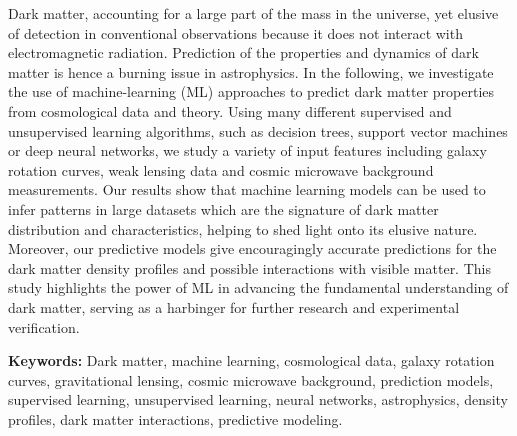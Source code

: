 
Dark matter, accounting for a large part of the mass in the universe, yet elusive of detection in conventional observations because it does not interact with electromagnetic radiation.\cite{planck2016} Prediction of the properties and dynamics of dark matter is hence a burning issue in astrophysics. In the following, we investigate the use of machine-learning (ML) approaches to predict dark matter properties from cosmological data and theory. Using many different supervised and unsupervised learning algorithms, such as decision trees, support vector machines or deep neural networks, we study a variety of input features including galaxy rotation curves, weak lensing data and cosmic microwave background measurements. Our results show that machine learning models can be used to infer patterns in large datasets which are the signature of dark matter distribution and characteristics, helping to shed light onto its elusive nature. Moreover, our predictive models give encouragingly accurate predictions for the dark matter density profiles and possible interactions with visible matter. This study highlights the power of ML in advancing the fundamental understanding of dark matter, serving as a harbinger for further research and experimental verification.


\vspace{8pt}
\textbf{Keywords:} Dark matter, machine learning, cosmological data, galaxy rotation curves, gravitational lensing, cosmic microwave background, prediction models, supervised learning, unsupervised learning, neural networks, astrophysics, density profiles, dark matter interactions, predictive modeling. 

 

